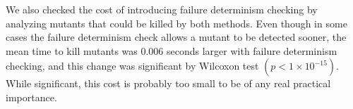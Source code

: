 We also checked the cost of introducing failure determinism checking
by analyzing mutants that could be killed by both methods.  Even
though in some cases the failure determinism check allows a mutant to
be detected sooner, the mean time to kill mutants was 0.006 seconds
larger with failure determinism checking, and this change was significant by Wilcoxon test
$(p < 1 \times 10^{-15})$.  While significant, this cost is probably
too small to be of any real practical importance.
